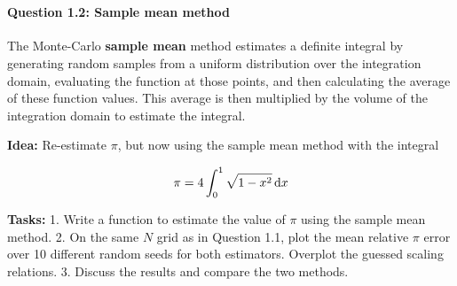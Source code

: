 \documentclass[11pt]{article}
\begin{document}
    \begin{center}
    \end{center}
    { \hspace*{\fill} \\}
    
    \paragraph{Question 1.2: Sample mean
method}\label{question-1.2-sample-mean-method}

The Monte-Carlo \textbf{sample mean} method estimates a definite
integral by generating random samples from a uniform distribution over
the integration domain, evaluating the function at those points, and
then calculating the average of these function values. This average is
then multiplied by the volume of the integration domain to estimate the
integral.

\textbf{Idea:} Re-estimate \(\pi\), but now using the sample mean method
with the integral

\[
\pi = 4 \int_0^1 \sqrt{1 - x^2} \, {\rm d}x
\]

\textbf{Tasks:} 1. Write a function to estimate the value of \(\pi\)
using the sample mean method. 2. On the same \(N\) grid as in Question
1.1, plot the mean relative \(\pi\) error over 10 different random seeds
for both estimators. Overplot the guessed scaling relations. 3. Discuss
the results and compare the two methods.
\end{document}
